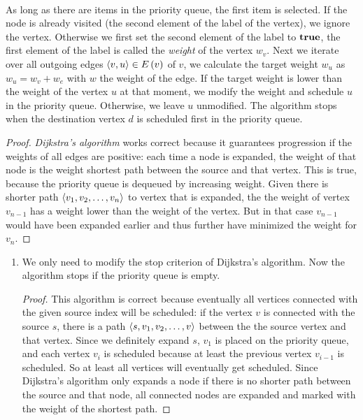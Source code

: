 \documentclass{article}
\begin{document}
\begin{exercise}
\begin{answer}
\paragraph{}
As long as there are items in the priority queue, the first item is selected. If the node is already visited (the second element of the label of the vertex), we ignore the vertex. Otherwise we first set the second element of the label to $\mbox{\bf true}$, the first element of the label is called the \emph{weight} of the vertex $w_v$. Next we iterate over all outgoing edges $\left\langle v,u \right\rangle\in E\left( v \right)$ of $v$, we calculate the target weight $w_u$ as $w_u=w_v+w_e$ with $w$ the weight of the edge. If the target weight is lower than the weight of the vertex $u$ at that moment, we modify the weight and schedule $u$ in the priority queue. Otherwise, we leave $u$ unmodified. The algorithm stops when the destination vertex $d$ is scheduled first in the priority queue.
\begin{proof}
\emph{Dijkstra's algorithm} works correct because it guarantees progression if the weights of all edges are positive: each time a node is expanded, the weight of that node is the weight shortest path between the source and that vertex. This is true, because the priority queue is dequeued by increasing weight. Given there is shorter path $\left\langle v_1,v_2,\ldots,v_n \right\rangle$ to vertex that is expanded, the the weight of vertex $v_{n-1}$ has a weight lower than the weight of the vertex. But in that case $v_{n-1}$ would have been expanded earlier and thus further have minimized the weight for $v_n$.
\end{proof}
\begin{enumerate}
 \item We only need to modify the stop criterion of Dijkstra's algorithm. Now the algorithm stops if the priority queue is empty.
 \begin{proof}
 This algorithm is correct because eventually all vertices connected with the given source index will be scheduled: if the vertex $v$ is connected with the source $s$, there is a path $\left\langle s,v_1,v_2,\ldots,v \right\rangle$ between the the source vertex and that vertex. Since we definitely expand $s$, $v_1$ is placed on the priority queue, and each vertex $v_i$ is scheduled because at least the previous vertex $v_{i-1}$ is scheduled. So at least all vertices will eventually get scheduled. Since Dijkstra's algorithm only expands a node if there is no shorter path between the source and that node, all connected nodes are expanded and marked with the weight of the shortest path.
 \end{proof}

\end{enumerate}
\end{answer}
\end{exercise}
\end{document}
